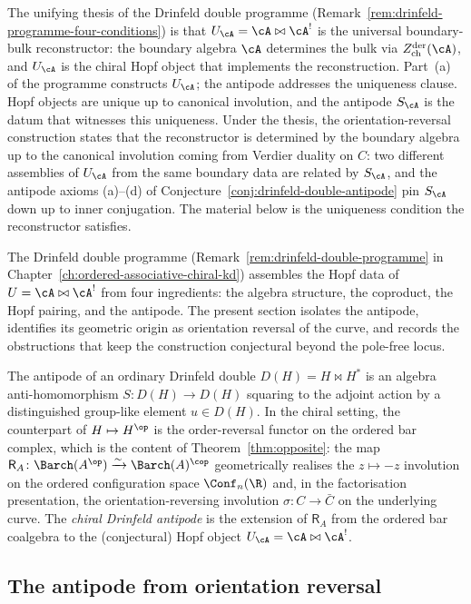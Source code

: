 The unifying thesis of the Drinfeld double programme
(Remark~\ref{rem:drinfeld-programme-four-conditions}) is that
$U_\cA = \cA\bowtie\cA^!$ is the universal boundary-bulk
reconstructor: the boundary algebra $\cA$ determines the bulk
via $Z^{\mathrm{der}}_{\mathrm{ch}}(\cA)$, and $U_\cA$ is the
chiral Hopf object that implements the reconstruction. Part~(a)
of the programme constructs $U_\cA$; the antipode addresses the
uniqueness clause. Hopf objects are unique up to canonical
involution, and the antipode $S_\cA$ is the datum that witnesses
this uniqueness. Under the thesis, the orientation-reversal
construction states that the reconstructor is determined by the
boundary algebra up to the canonical involution coming from
Verdier duality on $C$: two different assemblies of $U_\cA$ from
the same boundary data are related by $S_\cA$, and the antipode
axioms (a)--(d) of Conjecture~\ref{conj:drinfeld-double-antipode}
pin $S_\cA$ down up to inner conjugation. The material below is
the uniqueness condition the reconstructor satisfies.

The Drinfeld double programme (Remark~\ref{rem:drinfeld-double-programme}
 in Chapter~\ref{ch:ordered-associative-chiral-kd}) assembles the Hopf
data of $U = \cA \bowtie \cA^!$ from four ingredients: the algebra
structure, the coproduct, the Hopf pairing, and the antipode. The
present section isolates the antipode, identifies its geometric origin
as orientation reversal of the curve, and records the obstructions
that keep the construction conjectural beyond the pole-free locus.

The antipode of an ordinary Drinfeld double $D(H) = H \bowtie H^*$ is
an algebra anti-homomorphism $S \colon D(H) \to D(H)$ squaring to the
adjoint action by a distinguished group-like element $u \in D(H)$.
In the chiral
setting, the counterpart of $H \mapsto H^{\op}$ is the order-reversal
functor on the ordered bar complex, which is the content of
Theorem~\ref{thm:opposite}: the map
$\mathsf{R}_A \colon \Barch(A^{\op}) \xrightarrow{\sim} \Barch(A)^{\cop}$
geometrically realises the $z \mapsto -z$ involution on the ordered
configuration space $\Conf_n(\R)$ and, in the factorisation
presentation, the orientation-reversing involution
$\sigma \colon C \to \bar{C}$ on the underlying curve. The
\emph{chiral Drinfeld antipode} is the extension of $\mathsf{R}_A$
from the ordered bar coalgebra to the (conjectural) Hopf object
$U_\cA = \cA \bowtie \cA^!$.

\subsection{The antipode from orientation reversal}
\label{subsec:antipode-orientation-reversal}

